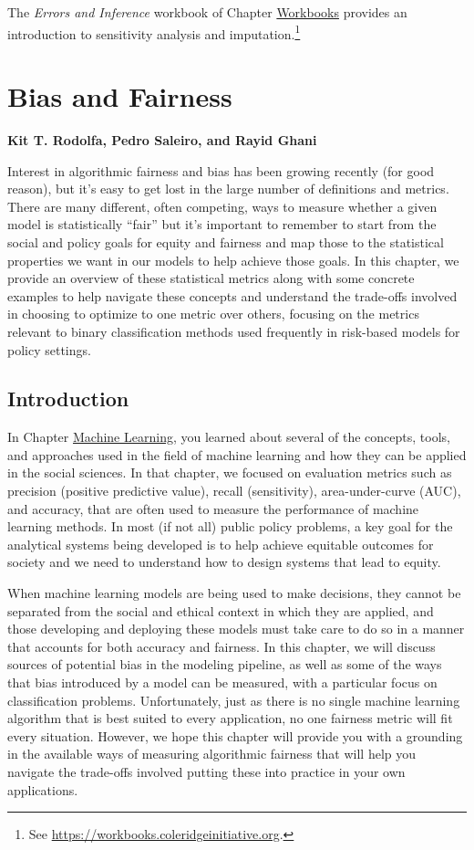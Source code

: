 \documentclass[]{krantz}
\begin{document}
The \emph{Errors and Inference} workbook of Chapter
\protect\hyperlink{chap:workbooks}{Workbooks} provides an introduction
to sensitivity analysis and imputation.\footnote{See
  \url{https://workbooks.coleridgeinitiative.org}.}

\hypertarget{chap:bias}{\chapter{Bias and Fairness}\label{chap:bias}}

\textbf{Kit T. Rodolfa, Pedro Saleiro, and Rayid Ghani}

Interest in algorithmic fairness and bias has been growing recently (for
good reason), but it's easy to get lost in the large number of
definitions and metrics. There are many different, often competing, ways
to measure whether a given model is statistically ``fair'' but it's
important to remember to start from the social and policy goals for
equity and fairness and map those to the statistical properties we want
in our models to help achieve those goals. In this chapter, we provide
an overview of these statistical metrics along with some concrete
examples to help navigate these concepts and understand the trade-offs
involved in choosing to optimize to one metric over others, focusing on
the metrics relevant to binary classification methods used frequently in
risk-based models for policy settings.

\section{Introduction}\label{introduction-4}

In Chapter \protect\hyperlink{chap:ml}{Machine Learning}, you learned
about several of the concepts, tools, and approaches used in the field
of machine learning and how they can be applied in the social sciences.
In that chapter, we focused on evaluation metrics such as precision
(positive predictive value), recall (sensitivity), area-under-curve
(AUC), and accuracy, that are often used to measure the performance of
machine learning methods. In most (if not all) public policy problems, a
key goal for the analytical systems being developed is to help achieve
equitable outcomes for society and we need to understand how to design
systems that lead to equity.

When machine learning models are being used to make decisions, they
cannot be separated from the social and ethical context in which they
are applied, and those developing and deploying these models must take
care to do so in a manner that accounts for both accuracy and fairness.
In this chapter, we will discuss sources of potential bias in the
modeling pipeline, as well as some of the ways that bias introduced by a
model can be measured, with a particular focus on classification
problems. Unfortunately, just as there is no single machine learning
algorithm that is best suited to every application, no one fairness
metric will fit every situation. However, we hope this chapter will
provide you with a grounding in the available ways of measuring
algorithmic fairness that will help you navigate the trade-offs involved
putting these into practice in your own applications.
\end{document}
